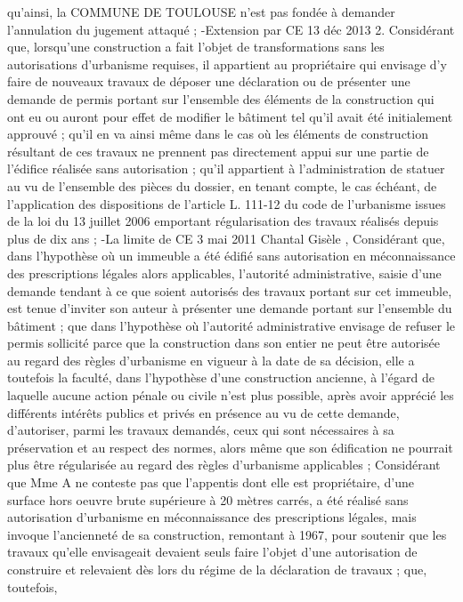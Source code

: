 \documentclass[11pt,a4paper]{report}
\begin{document}
	qu'ainsi, la COMMUNE DE TOULOUSE n'est pas fondée à demander l'annulation du jugement attaqué ;
	-Extension par CE 13 déc 2013 
	2. Considérant que, lorsqu'une construction a fait l'objet de transformations sans les autorisations d'urbanisme
	requises, il appartient au propriétaire qui envisage d'y faire de nouveaux travaux de déposer une déclaration ou
	de présenter une demande de permis portant sur l'ensemble des éléments de la construction qui ont eu ou auront
	pour effet de modifier le bâtiment tel qu'il avait été initialement approuvé ; qu'il en va ainsi même dans le cas où
	les éléments de construction résultant de ces travaux ne prennent pas directement appui sur une partie de
	l'édifice réalisée sans autorisation ; qu'il appartient à l'administration de statuer au vu de l'ensemble des pièces
	du dossier, en tenant compte, le cas échéant, de l'application des dispositions de l'article L. 111-12 du code de
	l'urbanisme issues de la loi du 13 juillet 2006 emportant régularisation des travaux réalisés depuis plus de dix
	ans ;
	-La limite de CE 3 mai 2011 Chantal Gisèle ,
	Considérant que, dans l'hypothèse où un immeuble a été édifié sans autorisation en méconnaissance des
	prescriptions légales alors applicables, l'autorité administrative, saisie d'une demande tendant à ce que soient
	autorisés des travaux portant sur cet immeuble, est tenue d'inviter son auteur à présenter une demande portant
	sur l'ensemble du bâtiment ; que dans l'hypothèse où l'autorité administrative envisage de refuser le permis
	sollicité parce que la construction dans son entier ne peut être autorisée au regard des règles d'urbanisme en
	vigueur à la date de sa décision, elle a toutefois la faculté, dans l'hypothèse d'une construction ancienne, à
	l'égard de laquelle aucune action pénale ou civile n'est plus possible, après avoir apprécié les différents intérêts
	publics et privés en présence au vu de cette demande, d'autoriser, parmi les travaux demandés, ceux qui sont
	nécessaires à sa préservation et au respect des normes, alors même que son édification ne pourrait plus être
	régularisée au regard des règles d'urbanisme applicables ; Considérant que Mme A ne conteste pas que
	l'appentis dont elle est propriétaire, d'une surface hors oeuvre brute supérieure à 20 mètres carrés, a été réalisé
	sans autorisation d'urbanisme en méconnaissance des prescriptions légales, mais invoque l'ancienneté de sa
	construction, remontant à 1967, pour soutenir que les travaux qu'elle envisageait devaient seuls faire l'objet
	d'une autorisation de construire et relevaient dès lors du régime de la déclaration de travaux ; que, toutefois,
\end{document}
